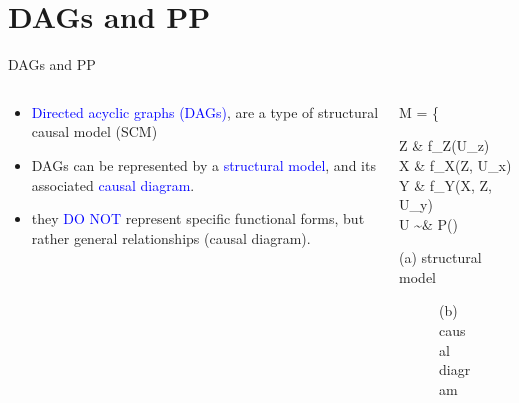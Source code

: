 \section{DAGs and PP}
%
%
\begin{frame}[t, negative]
	\subsectionpage
\end{frame}
%
%
\begin{frame}
	{DAGs and PP}
	\begin{columns}
		\begin{column}{0.5\textwidth}
			\begin{itemize}
				\item \textcolor{blue}{Directed acyclic graphs (DAGs)}, are a type of structural causal model (SCM) \cite{Pearl_2009, Cinelli_et_al_2021}
				\item DAGs can be represented by a \textcolor{blue}{structural model}, and its associated \textcolor{blue}{causal diagram}.
				\item they \textcolor{blue}{DO NOT} represent specific functional forms, but rather general relationships (causal diagram).
			\end{itemize}
		\end{column}
		\begin{column}{0.5\textwidth}  
			\begin{equ}
				M = \left\{ \begin{aligned} 
					Z \leftarrow & \; f_{Z}(U_{z}) \\
					X \leftarrow & \; f_{X}(Z, U_{x}) \\
					Y \leftarrow & \; f_{Y}(X, Z, U_{y}) \\
					U \sim & \; P()
				\end{aligned} \right
				\caption*{(a) structural model}
			\end{equ}
			\begin{figure}
				\caption*{(b) causal diagram }
			\end{figure}
		\end{column}
	\end{columns}
\end{frame}
